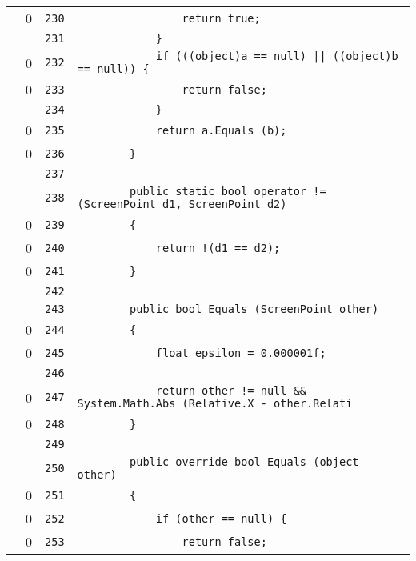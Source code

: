 \documentclass[a4paper,10pt]{article}
\begin{document}
\begin{longtable}[l]{lrrl}
\cellcolor{red} & 0 & \verb~230~ & \verb~                return true;~\\
\cellcolor{gray} &  & \verb~231~ & \verb~            }~\\
\cellcolor{red} & 0 & \verb~232~ & \verb~            if (((object)a == null) || ((object)b == null)) {~\\
\cellcolor{red} & 0 & \verb~233~ & \verb~                return false;~\\
\cellcolor{gray} &  & \verb~234~ & \verb~            }~\\
\cellcolor{red} & 0 & \verb~235~ & \verb~            return a.Equals (b);~\\
\cellcolor{red} & 0 & \verb~236~ & \verb~        }~\\
\cellcolor{gray} &  & \verb~237~ & \verb~~\\
\cellcolor{gray} &  & \verb~238~ & \verb~        public static bool operator != (ScreenPoint d1, ScreenPoint d2)~\\
\cellcolor{red} & 0 & \verb~239~ & \verb~        {~\\
\cellcolor{red} & 0 & \verb~240~ & \verb~            return !(d1 == d2);~\\
\cellcolor{red} & 0 & \verb~241~ & \verb~        }~\\
\cellcolor{gray} &  & \verb~242~ & \verb~~\\
\cellcolor{gray} &  & \verb~243~ & \verb~        public bool Equals (ScreenPoint other)~\\
\cellcolor{red} & 0 & \verb~244~ & \verb~        {~\\
\cellcolor{red} & 0 & \verb~245~ & \verb~            float epsilon = 0.000001f;~\\
\cellcolor{gray} &  & \verb~246~ & \verb~~\\
\cellcolor{red} & 0 & \verb~247~ & \verb~            return other != null && System.Math.Abs (Relative.X - other.Relati~\\
\cellcolor{red} & 0 & \verb~248~ & \verb~        }~\\
\cellcolor{gray} &  & \verb~249~ & \verb~~\\
\cellcolor{gray} &  & \verb~250~ & \verb~        public override bool Equals (object other)~\\
\cellcolor{red} & 0 & \verb~251~ & \verb~        {~\\
\cellcolor{red} & 0 & \verb~252~ & \verb~            if (other == null) {~\\
\cellcolor{red} & 0 & \verb~253~ & \verb~                return false;~\\

\end{longtable}
\end{document}

